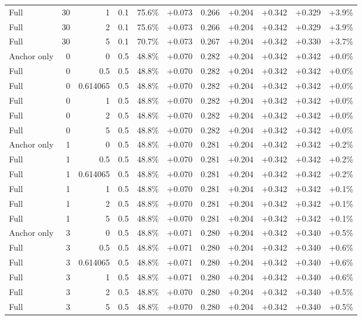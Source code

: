 \begin{table}[htbp]
\begin{tabular}{lrrrccccccc}
Full & 30 & 1 & 0.1 & 75.6\% & +0.073 & 0.266 & +0.204 & +0.342 & +0.329 & +3.9\% \\
Full & 30 & 2 & 0.1 & 75.6\% & +0.073 & 0.266 & +0.204 & +0.342 & +0.329 & +3.9\% \\
Full & 30 & 5 & 0.1 & 70.7\% & +0.073 & 0.267 & +0.204 & +0.342 & +0.330 & +3.7\% \\
Anchor only & 0 & 0 & 0.5 & 48.8\% & +0.070 & 0.282 & +0.204 & +0.342 & +0.342 & +0.0\% \\
Full & 0 & 0.5 & 0.5 & 48.8\% & +0.070 & 0.282 & +0.204 & +0.342 & +0.342 & +0.0\% \\
Full & 0 & 0.614065 & 0.5 & 48.8\% & +0.070 & 0.282 & +0.204 & +0.342 & +0.342 & +0.0\% \\
Full & 0 & 1 & 0.5 & 48.8\% & +0.070 & 0.282 & +0.204 & +0.342 & +0.342 & +0.0\% \\
Full & 0 & 2 & 0.5 & 48.8\% & +0.070 & 0.282 & +0.204 & +0.342 & +0.342 & +0.0\% \\
Full & 0 & 5 & 0.5 & 48.8\% & +0.070 & 0.282 & +0.204 & +0.342 & +0.342 & +0.0\% \\
Anchor only & 1 & 0 & 0.5 & 48.8\% & +0.070 & 0.281 & +0.204 & +0.342 & +0.342 & +0.2\% \\
Full & 1 & 0.5 & 0.5 & 48.8\% & +0.070 & 0.281 & +0.204 & +0.342 & +0.342 & +0.2\% \\
Full & 1 & 0.614065 & 0.5 & 48.8\% & +0.070 & 0.281 & +0.204 & +0.342 & +0.342 & +0.2\% \\
Full & 1 & 1 & 0.5 & 48.8\% & +0.070 & 0.281 & +0.204 & +0.342 & +0.342 & +0.1\% \\
Full & 1 & 2 & 0.5 & 48.8\% & +0.070 & 0.281 & +0.204 & +0.342 & +0.342 & +0.1\% \\
Full & 1 & 5 & 0.5 & 48.8\% & +0.070 & 0.281 & +0.204 & +0.342 & +0.342 & +0.1\% \\
Anchor only & 3 & 0 & 0.5 & 48.8\% & +0.071 & 0.280 & +0.204 & +0.342 & +0.340 & +0.5\% \\
Full & 3 & 0.5 & 0.5 & 48.8\% & +0.071 & 0.280 & +0.204 & +0.342 & +0.340 & +0.6\% \\
Full & 3 & 0.614065 & 0.5 & 48.8\% & +0.071 & 0.280 & +0.204 & +0.342 & +0.340 & +0.6\% \\
Full & 3 & 1 & 0.5 & 48.8\% & +0.071 & 0.280 & +0.204 & +0.342 & +0.340 & +0.6\% \\
Full & 3 & 2 & 0.5 & 48.8\% & +0.070 & 0.280 & +0.204 & +0.342 & +0.340 & +0.5\% \\
Full & 3 & 5 & 0.5 & 48.8\% & +0.070 & 0.280 & +0.204 & +0.342 & +0.340 & +0.5\% \\

\end{tabular}
\end{table}
